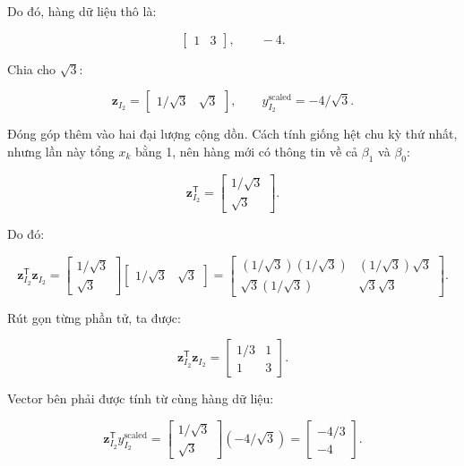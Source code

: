 \documentclass[12pt]{article}
\begin{document}
Do đó, hàng dữ liệu thô là:

\[
\begin{bmatrix}
1 & 3
\end{bmatrix},
\qquad
-4.
\]

Chia cho $\sqrt{3}$:

\[
\boldsymbol{z}_{I_2}
=
\begin{bmatrix}
1/\sqrt{3} & \sqrt{3}
\end{bmatrix},
\qquad
y_{I_2}^{\mathrm{scaled}}
=
-4/\sqrt{3}.
\]

Đóng góp thêm vào hai đại lượng cộng dồn. Cách tính giống hệt chu kỳ thứ nhất, nhưng lần này tổng $x_k$ bằng 1, nên hàng mới có thông tin về cả $\beta_1$ và $\beta_0$:

\[
\boldsymbol{z}_{I_2}^{\mathsf{T}}
=
\begin{bmatrix}
1/\sqrt{3}\\
\sqrt{3}
\end{bmatrix}.
\]

Do đó:

\[
\boldsymbol{z}_{I_2}^{\mathsf{T}}
\boldsymbol{z}_{I_2}
=
\begin{bmatrix}
1/\sqrt{3}\\
\sqrt{3}
\end{bmatrix}
\begin{bmatrix}
1/\sqrt{3} & \sqrt{3}
\end{bmatrix}
=
\begin{bmatrix}
(1/\sqrt{3})(1/\sqrt{3}) & (1/\sqrt{3})\sqrt{3}\\
\sqrt{3}(1/\sqrt{3}) & \sqrt{3}\sqrt{3}
\end{bmatrix}.
\]

Rút gọn từng phần tử, ta được:

\[
\boldsymbol{z}_{I_2}^{\mathsf{T}}
\boldsymbol{z}_{I_2}
=
\begin{bmatrix}
1/3 & 1\\
1 & 3
\end{bmatrix}.
\]

Vector bên phải được tính từ cùng hàng dữ liệu:

\[
\boldsymbol{z}_{I_2}^{\mathsf{T}}
y_{I_2}^{\mathrm{scaled}}
=
\begin{bmatrix}
1/\sqrt{3}\\
\sqrt{3}
\end{bmatrix}
(-4/\sqrt{3})
=
\begin{bmatrix}
-4/3\\
-4
\end{bmatrix}.
\]
\end{document}
